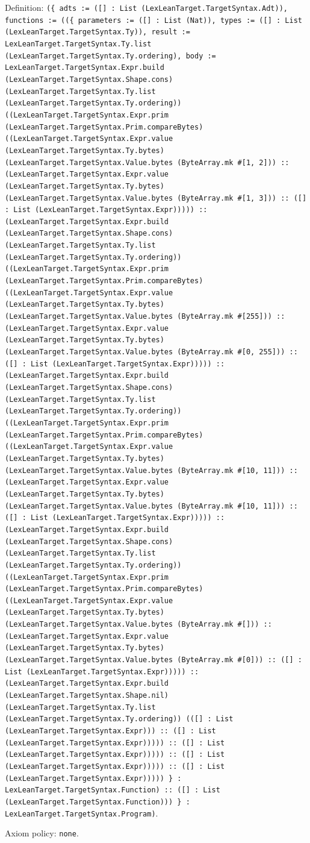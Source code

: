 \documentclass[11pt]{article}
\begin{document}
\noindent Definition: \texttt{(\{ adts := ([] : List (LexLeanTarget.TargetSyntax.Adt)), functions := ((\{ parameters := ([] : List (Nat)), types := ([] : List (LexLeanTarget.TargetSyntax.Ty)), result := LexLeanTarget.TargetSyntax.Ty.list (LexLeanTarget.TargetSyntax.Ty.ordering), body := LexLeanTarget.TargetSyntax.Expr.build (LexLeanTarget.TargetSyntax.Shape.cons) (LexLeanTarget.TargetSyntax.Ty.list (LexLeanTarget.TargetSyntax.Ty.ordering)) ((LexLeanTarget.TargetSyntax.Expr.prim (LexLeanTarget.TargetSyntax.Prim.compareBytes) ((LexLeanTarget.TargetSyntax.Expr.value (LexLeanTarget.TargetSyntax.Ty.bytes) (LexLeanTarget.TargetSyntax.Value.bytes (ByteArray.mk \#[1, 2])) :: (LexLeanTarget.TargetSyntax.Expr.value (LexLeanTarget.TargetSyntax.Ty.bytes) (LexLeanTarget.TargetSyntax.Value.bytes (ByteArray.mk \#[1, 3])) :: ([] : List (LexLeanTarget.TargetSyntax.Expr))))) :: (LexLeanTarget.TargetSyntax.Expr.build (LexLeanTarget.TargetSyntax.Shape.cons) (LexLeanTarget.TargetSyntax.Ty.list (LexLeanTarget.TargetSyntax.Ty.ordering)) ((LexLeanTarget.TargetSyntax.Expr.prim (LexLeanTarget.TargetSyntax.Prim.compareBytes) ((LexLeanTarget.TargetSyntax.Expr.value (LexLeanTarget.TargetSyntax.Ty.bytes) (LexLeanTarget.TargetSyntax.Value.bytes (ByteArray.mk \#[255])) :: (LexLeanTarget.TargetSyntax.Expr.value (LexLeanTarget.TargetSyntax.Ty.bytes) (LexLeanTarget.TargetSyntax.Value.bytes (ByteArray.mk \#[0, 255])) :: ([] : List (LexLeanTarget.TargetSyntax.Expr))))) :: (LexLeanTarget.TargetSyntax.Expr.build (LexLeanTarget.TargetSyntax.Shape.cons) (LexLeanTarget.TargetSyntax.Ty.list (LexLeanTarget.TargetSyntax.Ty.ordering)) ((LexLeanTarget.TargetSyntax.Expr.prim (LexLeanTarget.TargetSyntax.Prim.compareBytes) ((LexLeanTarget.TargetSyntax.Expr.value (LexLeanTarget.TargetSyntax.Ty.bytes) (LexLeanTarget.TargetSyntax.Value.bytes (ByteArray.mk \#[10, 11])) :: (LexLeanTarget.TargetSyntax.Expr.value (LexLeanTarget.TargetSyntax.Ty.bytes) (LexLeanTarget.TargetSyntax.Value.bytes (ByteArray.mk \#[10, 11])) :: ([] : List (LexLeanTarget.TargetSyntax.Expr))))) :: (LexLeanTarget.TargetSyntax.Expr.build (LexLeanTarget.TargetSyntax.Shape.cons) (LexLeanTarget.TargetSyntax.Ty.list (LexLeanTarget.TargetSyntax.Ty.ordering)) ((LexLeanTarget.TargetSyntax.Expr.prim (LexLeanTarget.TargetSyntax.Prim.compareBytes) ((LexLeanTarget.TargetSyntax.Expr.value (LexLeanTarget.TargetSyntax.Ty.bytes) (LexLeanTarget.TargetSyntax.Value.bytes (ByteArray.mk \#[])) :: (LexLeanTarget.TargetSyntax.Expr.value (LexLeanTarget.TargetSyntax.Ty.bytes) (LexLeanTarget.TargetSyntax.Value.bytes (ByteArray.mk \#[0])) :: ([] : List (LexLeanTarget.TargetSyntax.Expr))))) :: (LexLeanTarget.TargetSyntax.Expr.build (LexLeanTarget.TargetSyntax.Shape.nil) (LexLeanTarget.TargetSyntax.Ty.list (LexLeanTarget.TargetSyntax.Ty.ordering)) (([] : List (LexLeanTarget.TargetSyntax.Expr))) :: ([] : List (LexLeanTarget.TargetSyntax.Expr))))) :: ([] : List (LexLeanTarget.TargetSyntax.Expr))))) :: ([] : List (LexLeanTarget.TargetSyntax.Expr))))) :: ([] : List (LexLeanTarget.TargetSyntax.Expr))))) \} : LexLeanTarget.TargetSyntax.Function) :: ([] : List (LexLeanTarget.TargetSyntax.Function))) \} : LexLeanTarget.TargetSyntax.Program)}.\par
\noindent Axiom policy: \texttt{none}.\par
\end{document}
